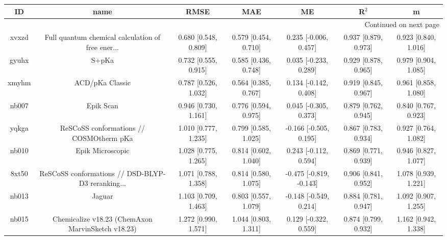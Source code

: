 \documentclass{article}
\begin{document}
\begin{center}
\begin{longtable}{|ccccccc|}
\toprule
    ID &                                               name &                  RMSE &                   MAE &                       ME &                 R$^2$ &                      m \\
\midrule
\endhead
\midrule
\multicolumn{7}{r}{{Continued on next page}} \\
\midrule
\endfoot

\bottomrule
\endlastfoot
 xvxzd &  Full quantum chemical calculation of free ener... &  0.680 [0.548, 0.809] &  0.579 [0.454, 0.710] &    0.235 [-0.006, 0.457] &  0.937 [0.879, 0.973] &   0.923 [0.840, 1.016] \\
 gyuhx &                                              S+pKa &  0.732 [0.555, 0.915] &  0.585 [0.436, 0.748] &    0.035 [-0.233, 0.289] &  0.929 [0.878, 0.965] &   0.979 [0.904, 1.085] \\
 xmyhm &                                    ACD/pKa Classic &  0.787 [0.526, 1.032] &  0.564 [0.385, 0.767] &    0.134 [-0.142, 0.408] &  0.919 [0.845, 0.967] &   0.961 [0.858, 1.080] \\
 nb007 &                                          Epik Scan &  0.946 [0.730, 1.161] &  0.776 [0.594, 0.975] &    0.045 [-0.305, 0.373] &  0.879 [0.762, 0.945] &   0.840 [0.767, 0.923] \\
 yqkga &            ReSCoSS conformations // COSMOtherm pKa &  1.010 [0.777, 1.235] &  0.799 [0.585, 1.025] &   -0.166 [-0.505, 0.195] &  0.867 [0.783, 0.934] &   0.927 [0.764, 1.082] \\
 nb010 &                                   Epik Microscopic &  1.028 [0.775, 1.265] &  0.814 [0.602, 1.040] &    0.243 [-0.112, 0.594] &  0.869 [0.771, 0.939] &   0.946 [0.827, 1.077] \\
 8xt50 &  ReSCoSS conformations // DSD-BLYP-D3 reranking... &  1.071 [0.788, 1.358] &  0.814 [0.580, 1.075] &  -0.475 [-0.819, -0.143] &  0.906 [0.841, 0.952] &   1.078 [0.939, 1.221] \\
 nb013 &                                             Jaguar &  1.103 [0.709, 1.463] &  0.803 [0.557, 1.079] &   -0.148 [-0.549, 0.214] &  0.884 [0.781, 0.947] &   1.092 [0.907, 1.255] \\
 nb015 &  Chemicalize v18.23 (ChemAxon MarvinSketch v18.23) &  1.272 [0.990, 1.571] &  1.044 [0.803, 1.311] &    0.129 [-0.322, 0.559] &  0.874 [0.799, 0.932] &   1.162 [0.942, 1.338] \\

\end{longtable}
\end{center}
\end{document}
